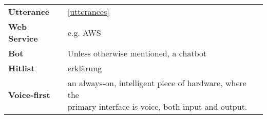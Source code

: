 \begin{flushleft}
\begin{tabular}{ll}
\textbf{Utterance}			&		\ref{utterances}\\



\textbf{Web Service}			&		e.g. AWS\\




\textbf{Bot}				&	Unless otherwise mentioned, a chatbot\\
\textbf{Hitlist}			&	erklärung\\
\textbf{Voice-first}		& \shortstack[l]{an always-on, intelligent piece of hardware, where the \\ primary interface is voice, both input and output.}\\



\end{tabular}
\end{flushleft}
